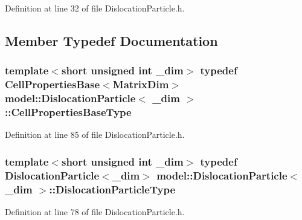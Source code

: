 Definition at line 32 of file Dislocation\+Particle.\+h.



\subsection{Member Typedef Documentation}
\hypertarget{structmodel_1_1_dislocation_particle_ae19c66fb92f6fcdf3796257f48fdfb36}{}
\subsubsection[{Cell\+Properties\+Base\+Type}]{\setlength{\rightskip}{0pt plus 5cm}template$<$short unsigned int \+\_\+dim$>$ typedef {\bf Cell\+Properties\+Base}$<${\bf Matrix\+Dim}$>$ {\bf model\+::\+Dislocation\+Particle}$<$ \+\_\+dim $>$\+::{\bf Cell\+Properties\+Base\+Type}}\label{structmodel_1_1_dislocation_particle_ae19c66fb92f6fcdf3796257f48fdfb36}


Definition at line 85 of file Dislocation\+Particle.\+h.

\hypertarget{structmodel_1_1_dislocation_particle_a707bb7bef0eeac9a9281626d2b30fdc6}{}
\subsubsection[{Dislocation\+Particle\+Type}]{\setlength{\rightskip}{0pt plus 5cm}template$<$short unsigned int \+\_\+dim$>$ typedef {\bf Dislocation\+Particle}$<$\+\_\+dim$>$ {\bf model\+::\+Dislocation\+Particle}$<$ \+\_\+dim $>$\+::{\bf Dislocation\+Particle\+Type}}\label{structmodel_1_1_dislocation_particle_a707bb7bef0eeac9a9281626d2b30fdc6}


Definition at line 78 of file Dislocation\+Particle.\+h.

\hypertarget{structmodel_1_1_dislocation_particle_a3c35f30e393557a4bcb372f270403c31}{}
